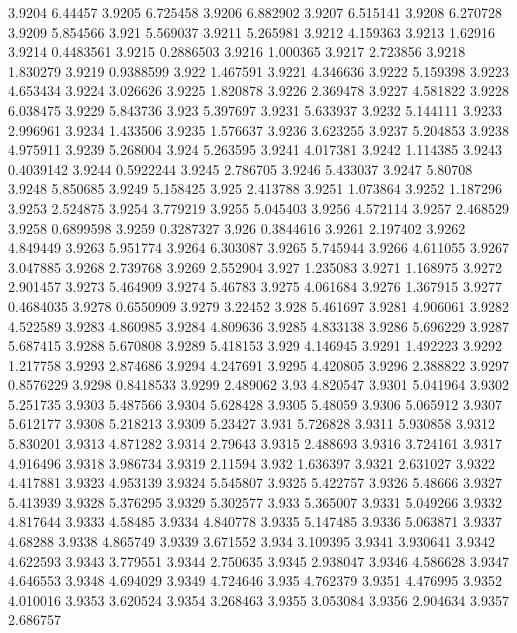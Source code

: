 3.9204  6.44457
3.9205  6.725458
3.9206  6.882902
3.9207  6.515141
3.9208  6.270728
3.9209  5.854566
3.921  5.569037
3.9211  5.265981
3.9212  4.159363
3.9213  1.62916
3.9214  0.4483561
3.9215  0.2886503
3.9216  1.000365
3.9217  2.723856
3.9218  1.830279
3.9219  0.9388599
3.922  1.467591
3.9221  4.346636
3.9222  5.159398
3.9223  4.653434
3.9224  3.026626
3.9225  1.820878
3.9226  2.369478
3.9227  4.581822
3.9228  6.038475
3.9229  5.843736
3.923  5.397697
3.9231  5.633937
3.9232  5.144111
3.9233  2.996961
3.9234  1.433506
3.9235  1.576637
3.9236  3.623255
3.9237  5.204853
3.9238  4.975911
3.9239  5.268004
3.924  5.263595
3.9241  4.017381
3.9242  1.114385
3.9243  0.4039142
3.9244  0.5922244
3.9245  2.786705
3.9246  5.433037
3.9247  5.80708
3.9248  5.850685
3.9249  5.158425
3.925  2.413788
3.9251  1.073864
3.9252  1.187296
3.9253  2.524875
3.9254  3.779219
3.9255  5.045403
3.9256  4.572114
3.9257  2.468529
3.9258  0.6899598
3.9259  0.3287327
3.926  0.3844616
3.9261  2.197402
3.9262  4.849449
3.9263  5.951774
3.9264  6.303087
3.9265  5.745944
3.9266  4.611055
3.9267  3.047885
3.9268  2.739768
3.9269  2.552904
3.927  1.235083
3.9271  1.168975
3.9272  2.901457
3.9273  5.464909
3.9274  5.46783
3.9275  4.061684
3.9276  1.367915
3.9277  0.4684035
3.9278  0.6550909
3.9279  3.22452
3.928  5.461697
3.9281  4.906061
3.9282  4.522589
3.9283  4.860985
3.9284  4.809636
3.9285  4.833138
3.9286  5.696229
3.9287  5.687415
3.9288  5.670808
3.9289  5.418153
3.929  4.146945
3.9291  1.492223
3.9292  1.217758
3.9293  2.874686
3.9294  4.247691
3.9295  4.420805
3.9296  2.388822
3.9297  0.8576229
3.9298  0.8418533
3.9299  2.489062
3.93  4.820547
3.9301  5.041964
3.9302  5.251735
3.9303  5.487566
3.9304  5.628428
3.9305  5.48059
3.9306  5.065912
3.9307  5.612177
3.9308  5.218213
3.9309  5.23427
3.931  5.726828
3.9311  5.930858
3.9312  5.830201
3.9313  4.871282
3.9314  2.79643
3.9315  2.488693
3.9316  3.724161
3.9317  4.916496
3.9318  3.986734
3.9319  2.11594
3.932  1.636397
3.9321  2.631027
3.9322  4.417881
3.9323  4.953139
3.9324  5.545807
3.9325  5.422757
3.9326  5.48666
3.9327  5.413939
3.9328  5.376295
3.9329  5.302577
3.933  5.365007
3.9331  5.049266
3.9332  4.817644
3.9333  4.58485
3.9334  4.840778
3.9335  5.147485
3.9336  5.063871
3.9337  4.68288
3.9338  4.865749
3.9339  3.671552
3.934  3.109395
3.9341  3.930641
3.9342  4.622593
3.9343  3.779551
3.9344  2.750635
3.9345  2.938047
3.9346  4.586628
3.9347  4.646553
3.9348  4.694029
3.9349  4.724646
3.935  4.762379
3.9351  4.476995
3.9352  4.010016
3.9353  3.620524
3.9354  3.268463
3.9355  3.053084
3.9356  2.904634
3.9357  2.686757
